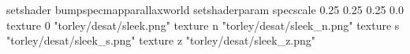 setshader bumpspecmapparallaxworld
setshaderparam specscale 0.25 0.25 0.25 0.0
texture 0 "torley/desat/sleek.png"
texture n "torley/desat/sleek_n.png"
texture s "torley/desat/sleek_s.png"
texture z "torley/desat/sleek_z.png"

